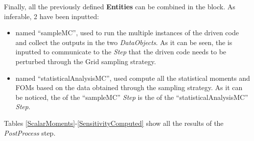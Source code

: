 \begin{enumerate}
   Finally, all the previously defined \textbf{Entities} can be combined in 
   the  block. As inferable, 
   2  have been inputted:
   \begin{itemize}
     \item {} named ``sampleMC'', used to run the 
     multiple  
     instances of the driven code and 
     collect the outputs in the two \textit{DataObjects}. As it can be
     seen, the  is inputted to communicate to the 
     \textit{Step} that the driven code needs to
     be perturbed through the Grid sampling strategy.
     \item {} named ``statisticalAnalysisMC'', used
     compute all the statistical moments and FOMs based on the
     data obtained through the sampling strategy. As it can be noticed, 
     the  of the ``sampleMC'' \textit{Step} is the  
      of the ``statisticalAnalysisMC''  \textit{Step}.
   \end{itemize}
\end{enumerate} 

Tables \ref{ScalarMoments}-\ref{SensitivityComputed} show all the results of the \textit{PostProcess} 
step.


